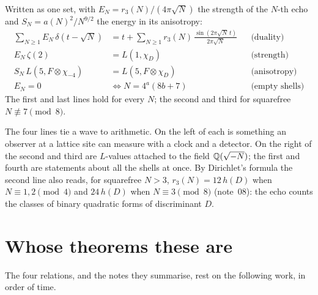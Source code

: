 \documentclass[11pt]{article}
\begin{document}
Written as one set, with $E_N = r_3(N)/(4\pi\sqrt N)$ the strength of the $N$-th echo and $S_N = a(N)^2/N^{9/2}$ the energy in its anisotropy:
\[
\boxed{\;
\begin{aligned}
  \textstyle\sum_{N\ge1} E_N\,\delta(t-\sqrt N) &= t+\textstyle\sum_{N\ge1} r_3(N)\,\frac{\sin(2\pi\sqrt N\,t)}{2\pi\sqrt N} &&\text{(duality)}\\[2pt]
  E_N\,\zeta(2) &= L(1,\chi_D) &&\text{(strength)}\\[2pt]
  S_N\,L(5,F\otimes\chi_{-4}) &= L(5,F\otimes\chi_D) &&\text{(anisotropy)}\\[2pt]
  E_N = 0 &\iff N = 4^a(8b+7) &&\text{(empty shells)}
\end{aligned}\;}
\]
The first and last lines hold for every $N$; the second and third for squarefree $N\not\equiv7\pmod 8$.

\physical
The four lines tie a wave to arithmetic.
On the left of each is something an observer at a lattice site can measure with a clock and a detector.
On the right of the second and third are $L$-values attached to the field $\mathbb{Q}(\sqrt{-N})$; the first and fourth are statements about all the shells at once.
By Dirichlet's formula the second line also reads, for squarefree $N>3$, $r_3(N) = 12\,h(D)$ when $N\equiv1,2\pmod4$ and $24\,h(D)$ when $N\equiv3\pmod8$ (note~08): the echo counts the classes of binary quadratic forms of discriminant $D$.

\section{Whose theorems these are}

The four relations, and the notes they summarise, rest on the following work, in order of time.
\end{document}

